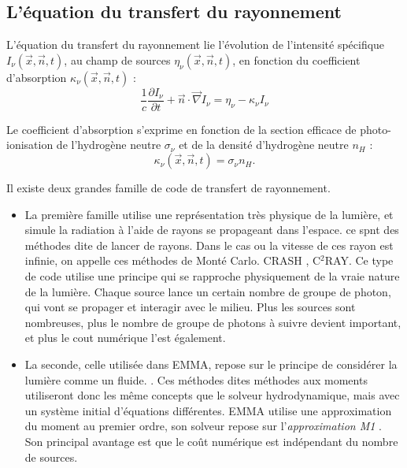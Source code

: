 \subsection{L'équation du transfert du rayonnement}

L'équation du transfert du rayonnement lie l'évolution de l'intensité spécifique $I_\nu(\vec{x},\vec{n},t)$, au champ de sources $\eta_\nu(\vec{x},\vec{n},t)$, en fonction du coefficient d'absorption $\kappa_\nu(\vec{x},\vec{n},t)$ :
\begin{equation}
\frac{1}{c} \frac{\partial I_\nu}{\partial t} + \vec{n}\cdot \vec{\nabla} I_\nu = \eta_\nu - \kappa_\nu I_\nu 
\label{eq:rad}
\end{equation}

Le coefficient d'absorption s'exprime en fonction de la section efficace de photo-ionisation de l'hydrogène neutre $\sigma_\nu$ et de la densité d'hydrogène neutre $n_H$ :
\begin{equation}
\kappa_\nu(\vec{x},\vec{n},t) = \sigma_\nu n_H.
\end{equation}

Il existe deux grandes famille de code de transfert de rayonnement.
\begin{itemize}
\item La première famille utilise une représentation très physique de la lumière, et simule la radiation à l'aide de rayons se propageant dans l'espace.
ce spnt des méthodes dite de lancer de rayons.
Dans le cas ou la vitesse de ces rayon est infinie, on appelle ces méthodes de Monté Carlo.
CRASH \citep{2003MNRAS.345..379M}, C$^2$RAY\citep{2006NewA...11..374M}.
Ce type de code utilise une principe qui se rapproche physiquement de la vraie nature de la lumière.
Chaque source lance un certain nombre de groupe de photon, qui vont se propager et interagir avec le milieu.
Plus les sources sont nombreuses, plus le nombre de groupe de photons à suivre devient important, et plus le cout numérique l'est également.

\item La seconde, celle utilisée dans EMMA, repose sur le principe de considérer la lumière comme un fluide. \citep{gnedin_multi-dimensional_2001, aubert_radiative_2008}.
Ces méthodes dites méthodes aux moments utiliseront donc les même concepts que le solveur hydrodynamique, mais avec un système initial d'équations différentes. 
EMMA utilise une approximation du moment au premier ordre, son solveur repose sur l'\textit{approximation M1} \citep{levermore_relating_1984}.
Son principal avantage est que le coût numérique est indépendant du nombre de sources.
\end{itemize}


